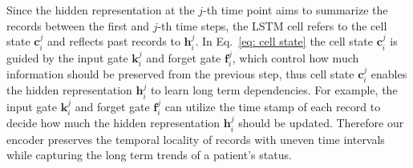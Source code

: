 Since the hidden representation at the $j$-th time point aims to summarize the records between the first and $j$-th time steps, the LSTM cell refers to the cell state $\mathbf{c}_i^j$ and reflects past records to $\mathbf{h}_i^j$. In Eq.~\eqref{eq: cell state} the cell state $\mathbf{c}_i^j$ is guided by the input gate $\mathbf{k}_i^j$ and forget gate $\mathbf{f}_i^j$, which control how much information should be preserved from the previous step, thus cell state $\mathbf{c}_i^j$ enables the hidden representation $\mathbf{h}_i^j$ to learn long term dependencies. For example, the input gate $\mathbf{k}_i^j$ and forget gate $\mathbf{f}_i^j$ can utilize the time stamp of each record to decide how much the hidden representation $\mathbf{h}_i^j$ should be updated. Therefore our encoder preserves the temporal locality of records with uneven time intervals while capturing the long term trends of a patient's status.


